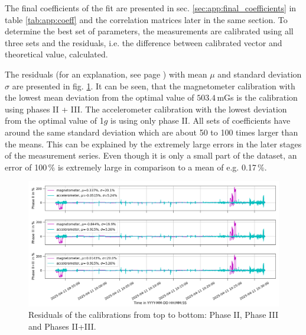 The final coefficients of the fit are presented in sec. \ref{sec:app:final_coefficients} in table \ref{tab:app:coeff} and the correlation matrices later in the same section. To determine the best set of parameters, the measurements are calibrated using all three sets and the residuals, i.e. the difference between calibrated vector and theoretical value, calculated. 

The residuals (for an explanation, see page \pageref{eq:residuals}) with mean $\mu$ and standard deviation $\sigma$ are presented in fig. \ref{fig:res:residuals}. It can be seen, that the magnetometer calibration with the lowest mean deviation from the optimal value of $503.4$\,mGs is the calibration using phases II + III. The accelerometer calibration with the lowest deviation from the optimal value of 1$g$ is using only phase II. All sets of coefficients have around the same standard deviation which are about 50 to 100 times larger than the means. This can be explained by the extremely large errors in the later stages of the measurement series. Even though it is only a small part of the dataset, an error of 100\,\% is extremely large in comparison to a mean of e.g. 0.17\,\%.
\begin{figure}[H]
    \centering
    \includegraphics[width=\linewidth]{images/04_results/residuals_mag_acc_calibrations.png}
    \caption[Residuals of the calibrations.]{Residuals of the calibrations from top to bottom: Phase II, Phase III and Phases II+III.}
    \label{fig:res:residuals}
\end{figure}


